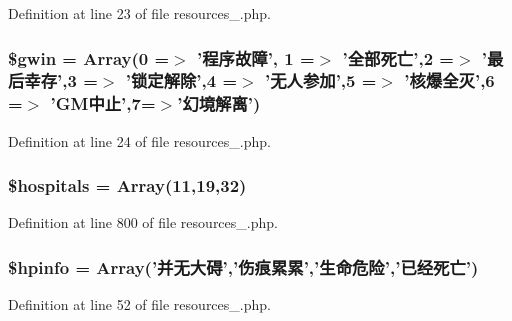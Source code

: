 Definition at line 23 of file resources\+\_.\+php.

\hypertarget{cache_2resources__1_8php_a2957a034129d3598a5d35640b8906532}{
\subsubsection[{\$gwin}]{\setlength{\rightskip}{0pt plus 5cm}\$gwin = Array(0 =$>$ '程序故障', 1 =$>$ '全部死亡',2 =$>$ '最后幸存',3 =$>$ '锁定解除',4 =$>$ '无人参加',5 =$>$ '核爆全灭',6 =$>$ 'G\+M中止',7=$>$'幻境解离')}}\label{cache_2resources__1_8php_a2957a034129d3598a5d35640b8906532}


Definition at line 24 of file resources\+\_.\+php.

\hypertarget{cache_2resources__1_8php_a522f774b7af7274c8142c2bf00854709}{
\subsubsection[{\$hospitals}]{\setlength{\rightskip}{0pt plus 5cm}\$hospitals = Array(11,19,32)}}\label{cache_2resources__1_8php_a522f774b7af7274c8142c2bf00854709}


Definition at line 800 of file resources\+\_.\+php.

\hypertarget{cache_2resources__1_8php_a6f91f38ee66d31d99255d9dc86032980}{
\subsubsection[{\$hpinfo}]{\setlength{\rightskip}{0pt plus 5cm}\$hpinfo = Array('并无大碍','伤痕累累','生命危险','已经死亡')}}\label{cache_2resources__1_8php_a6f91f38ee66d31d99255d9dc86032980}


Definition at line 52 of file resources\+\_.\+php.

